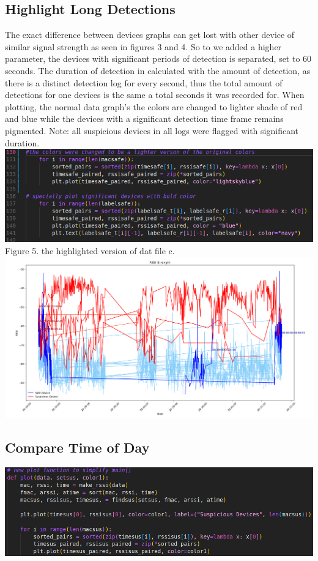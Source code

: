 \documentclass{article}
\begin{document}
\begin{multicols}{2}
\subsection{Highlight Long Detections}
The exact difference between devices graphs can get lost with other device of similar signal strength as seen in figures 3 and 4. So to we added a higher parameter, the devices with significant periods of detection is separated, set to 60 seconds. The duration of detection in calculated with the amount of detection, as there is a distinct detection log for every second, thus the total amount of detections for one devices is the same a total seconds it was recorded for. When plotting, the normal data graph's the colors are changed to lighter shade of red and blue while the devices with a significant detection time frame remains pigmented. Note: all suspicious devices in all logs were flagged with significant duration.
\includegraphics[width=1\linewidth]{lighter-color-plot.png}
Figure 5. the highlighted version of dat file c. 
\includegraphics[width=1\linewidth]{line-label-time.png}



\subsection{Compare Time of Day}
\begin{center}
    

\includegraphics[width=1\linewidth]{plot-function-code.png}
\end{center}
\end{multicols}
\end{document}
